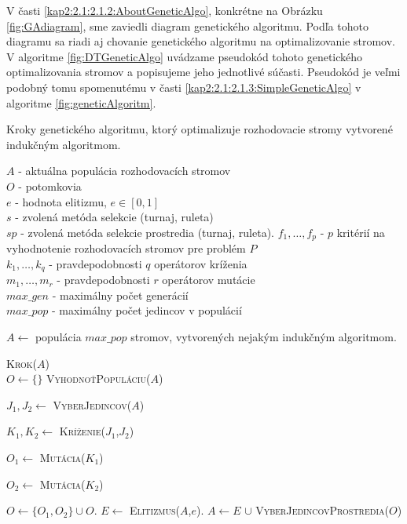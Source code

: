 V časti \ref{kap2:2.1:2.1.2:AboutGeneticAlgo}, konkrétne na Obrázku \ref{fig:GAdiagram}, sme zaviedli diagram genetického algoritmu. Podľa tohoto diagramu sa riadi aj chovanie genetického algoritmu na optimalizovanie stromov.
V algoritme \ref{fig:DTGeneticAlgo} uvádzame pseudokód tohoto genetického optimalizovania stromov a popisujeme jeho jednotlivé súčasti.
Pseudokód je veľmi podobný tomu spomenutému v časti \ref{kap2:2.1:2.1.3:SimpleGeneticAlgo} v algoritme \ref{fig:geneticAlgoritm}.

\begin{algorithm}
\caption{Kroky genetického algoritmu, ktorý optimalizuje rozhodovacie stromy vytvorené indukčným algoritmom.}\label{fig:DTGeneticAlgo}
$A$ - aktuálna populácia rozhodovacích stromov \\
$O$ - potomkovia \\
$e$ - hodnota elitizmu, $e \in [0,1]$ \\
$s$ - zvolená metóda selekcie (turnaj, ruleta) \\
$sp$ - zvolená metóda selekcie prostredia (turnaj, ruleta).
$f_1,\ldots,f_p$ - $p$ kritérií na vyhodnotenie rozhodovacích stromov pre problém $P$\\
$k_{1},\ldots,k_{q}$ - pravdepodobnosti $q$ operátorov kríženia\\
$m_{1},\ldots,m_{r}$ - pravdepodobnosti $r$ operátorov mutácie\\
$max\_gen$ - maximálny počet generácií \\
$max\_pop$ - maximálny počet jedincov v populácií \\
\bigskip
\begin{algorithmic}[1]
\State \parbox[t]{375pt}{$A \gets $ populácia $max\_pop$ stromov, vytvorených nejakým indukčným algoritmom.}
	\State \textsc{Krok($A$)}
\EndFor
\\
	\State $O \gets \{\}$
	\State \textsc{VyhodnoťPopuláciu($A$)}
		\State \parbox[t]{350pt}{$J_1,J_2 \gets $ \textsc{VyberJedincov($A$)}}
		\State \parbox[t]{350pt}{$K_1,K_2 \gets $ \textsc{Kríženie($J_1$,$J_2$)}}
		\State \parbox[t]{350pt}{$O_1 \gets $ \textsc{Mutácia($K_1$)}}
		\State \parbox[t]{350pt}{$O_2 \gets $ \textsc{Mutácia($K_2$)}}		
		\State $O \gets \{O_1,O_2\} \cup O$.
	\EndWhile
	\State $E \gets$ \textsc{Elitizmus($A$,$e$)}.
	\State $A \gets  E$ $\cup$ \textsc{VyberJedincovProstredia($O$)} 
\EndProcedure
\\

\end{algorithmic}
\end{algorithm}
